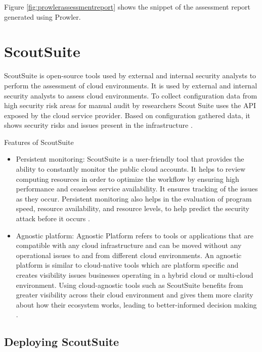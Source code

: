 Figure \ref{fig:prowlerassessmentreport} shows the snippet of the assessment report generated using Prowler.


\hfill \break
\section{ScoutSuite}

\par ScoutSuite is open-source tools used by external and
internal security analysts to perform the assessment of cloud environments.
It is used by external and internal security analysts to assess cloud environments.
To collect configuration data from high security risk areas for manual audit by researchers Scout Suite uses the API exposed by the cloud service provider.
Based on configuration gathered data, it shows security risks and issues present in the infrastructure \cite{72}.
\hfill \break
\par Features of ScoutSuite
\begin{itemize}
    \item Persistent monitoring: ScoutSuite is a user-friendly tool that provides the ability to constantly monitor
    the public cloud accounts.
    It helps to review computing resources in order to optimize the workflow by ensuring high performance and ceaseless service availability.
    It ensures tracking of the issues as they occur.
    Persistent monitoring also helps in the evaluation of program speed, resource availability, and resource levels, to help predict the security attack before it occurs \cite{73}.
\end{itemize}
\begin{itemize}
    \item Agnostic platform: Agnostic Platform refers to tools or applications that are compatible with any cloud
    infrastructure and can be moved without any operational issues to and from different cloud environments.
    An agnostic platform is similar to cloud-native tools which are platform specific and creates visibility issues businesses operating in a hybrid cloud or multi-cloud environment.
    Using cloud-agnostic tools such as ScoutSuite benefits from greater visibility across their cloud environment and gives them more clarity about how their ecosystem works, leading to better-informed decision making \cite{73}.
\end{itemize}


\hfill \break

\subsection{Deploying ScoutSuite}

